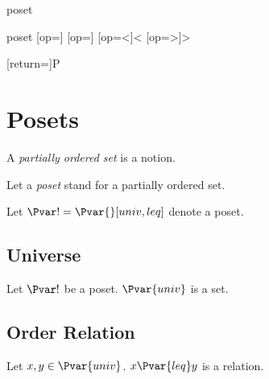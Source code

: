 \documentclass{stex}
\begin{document}
\begin{smodule}{poset}
  \STEXexport{
    \let\oldleq\leq
    \let\leq\relax
    \let\oldgeq\geq
    \let\geq\relax
  }

  \begin{mathstructure}{poset}
    [op=\oldleq]{\;\oldleq\;}
    [op=\oldgeq]{\;\oldgeq\;}
    [op=<]{\;<\;}
    [op=>]{\;>\;}
  \end{mathstructure}

  [return={\poset[comp=##1]}]{\mathcal P}

  \section{Posets}

  \begin{forthel}     
  \end{forthel}
  
  \begin{forthel}
    \begin{signature*}
      A \emph{partially ordered set} is a notion.
    \end{signature*}

    Let a \emph{poset} stand for a partially ordered set.

    Let $\Pvar! = \Pvar{}[univ,leq]$ denote a poset.
  \end{forthel}
  
  \subsection{Universe}
  
  \begin{forthel}
    \begin{signature*}
      Let $\Pvar!$ be a poset.
      $\Pvar{univ}$ is a set.
    \end{signature*}
  \end{forthel}
  
  \subsection{Order Relation}
  
  \begin{forthel}
    \begin{signature*}
      Let $x, y \in \Pvar{univ}$.
      $x {\Pvar{leq}} y$ is a relation.
    \end{signature*}


\end{forthel}
\end{smodule}
\end{document}
